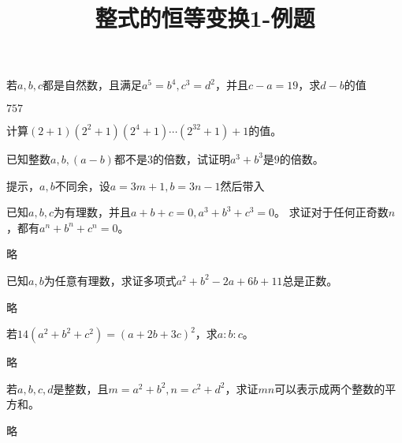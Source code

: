 \documentclass[windows,csize4]{BHCexam}
\title{整式的恒等变换1-例题}
\begin{document}
\maketitle


\begin{groups}

    \begin{questions}[]
        \question[5] 若$a,b,c$都是自然数，且满足$a^5=b^4,c^3=d^2$，并且$c-a=19$，求$d-b$的值
        \begin{solution}{0.5cm}
            \methodonly $757$
        \end{solution}
        \vspace{3.5cm}

        \question[5] 计算$(2+1)(2^2+1)(2^4+1)\cdots (2^{32}+1)+1$的值。
        \begin{solution}{0.5cm}
            \methodonly 
        \end{solution}
        \vspace{3.5cm}

        \question[5] 已知整数$a,b,(a-b)$都不是$3$的倍数，试证明$a^3+b^3$是$9$的倍数。
        \begin{solution}{0.5cm}
            \methodonly 提示，$a,b$不同余，设$a=3m+1,b=3n-1$然后带入
        \end{solution}
        \vspace{3.5cm}

        \question[5] 已知$a,b,c$为有理数，并且$a+b+c=0, a^3+b^3+c^3=0$。
        求证\quad 对于任何正奇数$n$，都有$a^n+b^n+c^n=0$。
        \begin{solution}{0.5cm}
            \methodonly 略
        \end{solution}
        \vspace{3.5cm}

        \question[5] 已知$a,b$为任意有理数，求证\quad 多项式$a^2+b^2-2a+6b+11$总是正数。
        \begin{solution}{0.5cm}
            \methodonly 略
        \end{solution}
        \vspace{3.5cm}

        \question[5] 若$14(a^2+b^2+c^2)=(a+2b+3c)^2$，求$a:b:c$。
        \begin{solution}{0.5cm}
            \methodonly 略
        \end{solution}
        \vspace{3.5cm}

        \question[5] 若$a,b,c,d$是整数，且$m=a^2+b^2,n=c^2+d^2$，求证\quad $mn$可以表示成两个整数的平方和。
        \begin{solution}{0.5cm}
            \methodonly 略
        \end{solution}
        \vspace{3.5cm}


\end{questions}
\end{groups}
\end{document}
